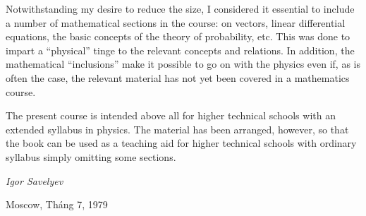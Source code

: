 Notwithstanding my desire to reduce the size, I considered it essential to include a number of mathematical sections in the course: on vectors, linear differential equations, the basic concepts of the theory of probability, etc. This was done to impart a ``physical'' tinge to the relevant concepts and relations. In addition, the mathematical ``inclusions'' make it possible to go on with the physics even if, as is often the case, the relevant material has not yet been covered in a mathematics course.

The present course is intended above all for higher technical schools with an extended syllabus in physics. The material has been arranged, however, so that the book can be used as a teaching aid for higher technical schools with ordinary syllabus simply omitting some sections.

\begin{flushright}
	\emph{Igor Savelyev}
\end{flushright}

\noindent
Moscow, Tháng 7, 1979

